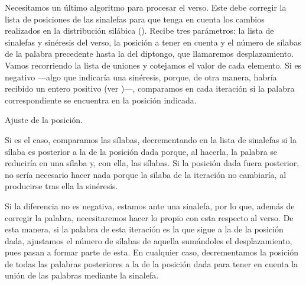Necesitamos un último algoritmo para procesar el verso. Este debe corregir la lista de posiciones de las sinalefas para que tenga en cuenta los cambios realizados en la distribución silábica (). Recibe tres parámetros: la lista de sinalefas y sinéresis del verso, la posición a tener en cuenta y el número de sílabas de la palabra precedente hasta la del diptongo, que llamaremos desplazamiento. Vamos recorriendo la lista de uniones y cotejamos el valor de cada elemento. Si es negativo —algo que indicaría una sinéresis, porque, de otra manera, habría recibido un entero positivo (ver )—, comparamos en cada iteración si la palabra correspondiente se encuentra en la posición indicada.

\begin{algorithm}[!ht]
	\caption{Ajuste de la posición.}\label{list:VerSeMetre8}
\end{algorithm}

Si es el caso, comparamos las sílabas, decrementando en la lista de sinalefas si la sílaba es posterior a la de la posición dada porque, al hacerla, la palabra se reduciría en una sílaba y, con ella, las sílabas. Si la posición dada fuera posterior, no sería necesario hacer nada porque la sílaba de la iteración no cambiaría, al producirse tras ella la sinéresis.

Si la diferencia no es negativa, estamos ante una sinalefa, por lo que, además de corregir la palabra, necesitaremos hacer lo propio con esta respecto al verso. De esta manera, si la palabra de esta iteración es la que sigue a la de la posición dada, ajustamos el número de sílabas de aquella sumándoles el desplazamiento, pues pasan a formar parte de esta. En cualquier caso, decrementamos la posición de todas las palabras posteriores a la de la posición dada para tener en cuenta la unión de las palabras mediante la sinalefa.



